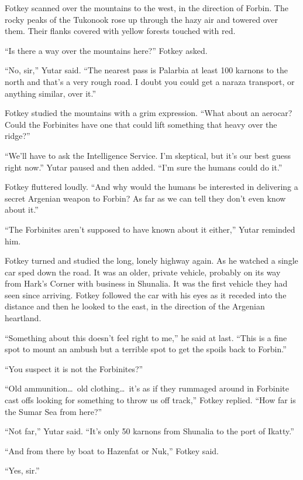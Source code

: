 Fotkey scanned over the mountains to the west, in the direction of Forbin. The rocky peaks of
the Tukonook rose up through the hazy air and towered over them. Their flanks covered with
yellow forests touched with red.

``Is there a way over the mountains here?'' Fotkey asked.

``No, sir,'' Yutar said. ``The nearest pass is Palarbia at least 100 karnons to the north and
that's a very rough road. I doubt you could get a naraza transport, or anything similar, over
it.''

Fotkey studied the mountains with a grim expression. ``What about an aerocar? Could the
Forbinites have one that could lift something that heavy over the ridge?''

``We'll have to ask the Intelligence Service. I'm skeptical, but it's our best guess right
now.'' Yutar paused and then added. ``I'm sure the humans could do it.''

Fotkey fluttered loudly. ``And why would the humans be interested in delivering a secret
Argenian weapon to Forbin? As far as we can tell they don't even know about it.''

``The Forbinites aren't supposed to have known about it either,'' Yutar reminded him.

Fotkey turned and studied the long, lonely highway again. As he watched a single car sped down
the road. It was an older, private vehicle, probably on its way from Hark's Corner with business
in Shunalia. It was the first vehicle they had seen since arriving. Fotkey followed the car with
his eyes as it receded into the distance and then he looked to the east, in the direction of
the Argenian heartland.

``Something about this doesn't feel right to me,'' he said at last. ``This is a fine spot to
mount an ambush but a terrible spot to get the spoils back to Forbin.''

``You suspect it is not the Forbinites?''

``Old ammunition\ldots\ old clothing\ldots\ it's as if they rummaged around in Forbinite cast
offs looking for something to throw us off track,'' Fotkey replied. ``How far is the Sumar Sea
from here?''

``Not far,'' Yutar said. ``It's only 50 karnons from Shunalia to the port of Ikatty.''

``And from there by boat to Hazenfat or Nuk,'' Fotkey said.

``Yes, sir.''

